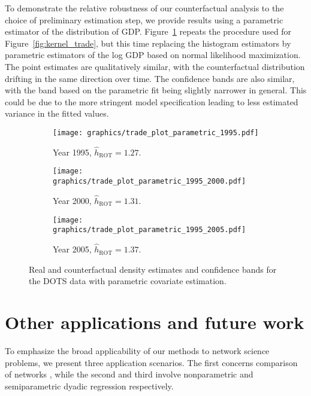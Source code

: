 \documentclass[11pt,lof]{puthesis}
\DeclareMathOperator{\ROT}{ROT}
\theoremstyle{break}
\theoremstyle{proof}
\begin{document}
To demonstrate the relative robustness of our counterfactual analysis to the
choice of preliminary estimation step, we provide results using a
parametric estimator of the distribution of GDP.
Figure~\ref{fig:kernel_trade_para}
repeats the procedure used for Figure~\ref{fig:kernel_trade}, but this time
replacing
the histogram estimators by parametric estimators of the log GDP based on
normal likelihood maximization. The point estimates are qualitatively similar,
with the counterfactual distribution drifting in the same direction over time.
The confidence bands are also similar, with the band based on the parametric
fit being slightly narrower in general. This could be due to the more stringent
model specification leading to less estimated variance in the fitted values.

\begin{figure}[t]
  \centering
  \begin{subfigure}{0.32\textwidth}
    \centering
    \texttt{[image: graphics/trade\_plot\_parametric\_1995.pdf]}
    \caption{Year 1995, $\hat h_{\ROT} = 1.27$.}
  \end{subfigure}
  \begin{subfigure}{0.32\textwidth}
    \centering
    \texttt{[image: graphics/trade\_plot\_parametric\_1995\_2000.pdf]}
    \caption{Year 2000, $\hat h_{\ROT} = 1.31$.}
  \end{subfigure}
  \begin{subfigure}{0.32\textwidth}
    \centering
    \texttt{[image: graphics/trade\_plot\_parametric\_1995\_2005.pdf]}
    \caption{Year 2005, $\hat h_{\ROT} = 1.37$.}
  \end{subfigure}
  \caption[Parametric likelihood-based estimation and
  inference for the DOTS data]{
    Real and counterfactual density estimates and confidence bands for
  the DOTS data with parametric covariate estimation.}
  \label{fig:kernel_trade_para}
\end{figure}

\section{Other applications and future work}
\label{sec:kernel_future}

To emphasize the broad applicability of our methods to network science
problems, we present three application scenarios. The first concerns comparison
of networks \citep{kolaczyk2009statistical}, while the second and third involve
nonparametric and semiparametric dyadic regression respectively.
\end{document}

